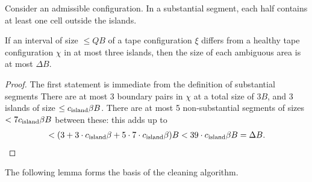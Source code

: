 \documentclass[11pt]{memoir}
\theoremstyle{definition} %
\renewcommand{\le}{\leq}
\def\B{B}
\newcommand{\Q}{Q}
\newcommand{\cns}[1]{c_{\textrm{\upshape #1}}}
\begin{document}
\begin{lemma}\label{lem:ambiguous}
Consider an admissible configuration.
In a substantial segment, each half contains at least one cell outside the islands.

If an interval of size \( \le  \Q\B \) of a tape configuration \( \xi \) differs from a  healthy tape 
configuration \( \chi \) in at most three islands, then 
the size of each ambiguous area is at most \( \Delta\B \).
\end{lemma}
\begin{proof}
The first statement is immediate from the definition of substantial segments 
There are at most 3 boundary pairs in \( \chi \) at a total size of \( 3\B \), and
3 islands of size \( \le\cns{island}\beta\B \).
There are at most 5 non-substantial segments of sizes \( < 7\cns{island}\beta\B \)
between these: this adds up to
\begin{align*}
 < (3+3\cdot\cns{island}\beta+ 5\cdot 7\cdot\cns{island}\beta)\B<39\cdot\cns{island}\beta\B=\Delta\B.
 \end{align*}
\end{proof}

The following lemma forms the basis of the cleaning algorithm.
\end{document}
